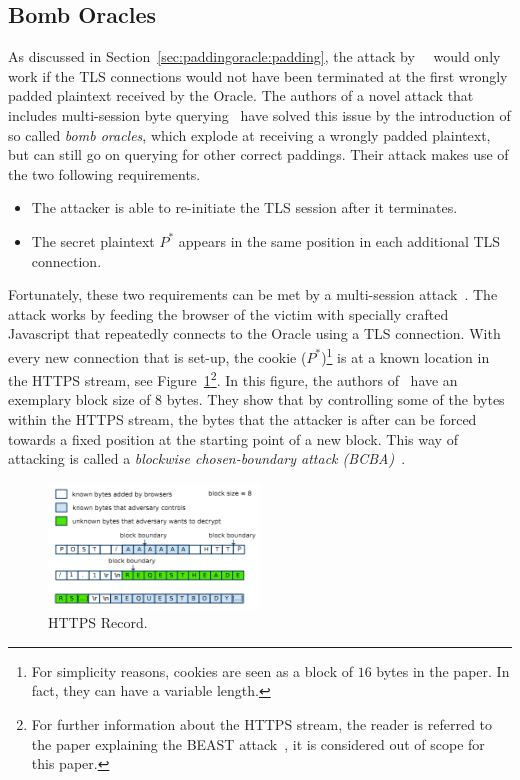 \documentclass[10pt,conference,a4paper]{IEEEtran}
\begin{document}
\subsection{Bomb Oracles}
\label{sec:paddingoracle:bomb}
As discussed in Section~\ref{sec:paddingoracle:padding}, the attack by~\citeauthor{vaudenay2002security}~\cite{vaudenay2002security} would only work if the TLS connections would not have been terminated at the first wrongly padded plaintext received by the Oracle. The authors of a novel attack that includes multi-session byte querying~\cite{canvel2003password} have solved this issue by the introduction of so called \textit{bomb oracles}, which explode at receiving a wrongly padded plaintext, but can still go on querying for other correct paddings. Their attack makes use of the two following requirements.
\begin{itemize}
	\item The attacker is able to re-initiate the TLS session after it terminates.
	\item The secret plaintext $P^{*}$ appears in the same position in each additional TLS connection.
\end{itemize}
Fortunately, these two requirements can be met by a multi-session attack~\cite{vaudenay2002security}. The attack works by feeding the browser of the victim with specially crafted Javascript that repeatedly connects to the Oracle using a TLS connection. With every new connection that is set-up, the cookie ($P^{*}$)\footnote{For simplicity reasons, cookies are seen as a block of $16$ bytes in the paper. In fact, they can have a variable length.} is at a known location in the HTTPS stream, see Figure~\ref{fig:beast_http}\footnote{For further information about the HTTPS stream, the reader is referred to the paper explaining the BEAST attack~\cite{duong2011here}, it is considered out of scope for this paper.}. In this figure, the authors of~\cite{duong2011here} have an exemplary block size of 8 bytes. They show that by controlling some of the bytes within the HTTPS stream, the bytes that the attacker is after can be forced towards a fixed position at the starting point of a new block.  This way of attacking is called a \textit{blockwise chosen-boundary attack (BCBA)}~\cite{duong2011here}.

\begin{figure}[h]
	\centering
	\includegraphics[width=0.5\textwidth]{beast_https.png}
	\caption{HTTPS Record.~\cite{duong2011here}}
	\label{fig:beast_http}
\end{figure}
\end{document}
